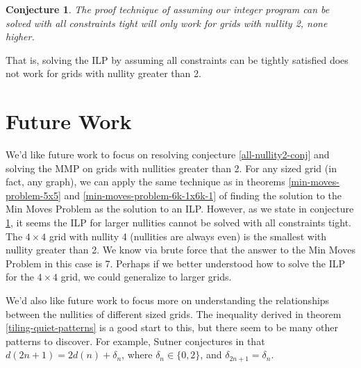 \documentclass[a4paper]{article}
\newtheorem{conjecture}{Conjecture}
\begin{document}
	\begin{conjecture}\label{ilp-conj}
		The proof technique of assuming our integer program can be solved with all constraints tight will only work for grids with nullity 2, none higher.
	\end{conjecture}
	That is, solving the ILP by assuming all constraints can be tightly satisfied does not work for grids with nullity greater than 2.
	
	\section{Future Work}
	We'd like future work to focus on resolving conjecture \ref{all-nullity2-conj} and solving the MMP on grids with nullities greater than 2.
	For any sized grid (in fact, any graph), we can apply the same technique as in theorems \ref{min-moves-problem-5x5} and \ref{min-moves-problem-6k-1x6k-1} of finding the solution to the Min Moves Problem as the solution to an ILP.
	However, as we state in conjecture \ref{ilp-conj}, it seems the ILP for larger nullities cannot be solved with all constraints tight.
	The $4 \times 4$ grid with nullity 4 (nullities are always even) is the smallest with nullity greater than 2.
	We know via brute force that the answer to the Min Moves Problem in this case is 7.
	Perhaps if we better understood how to solve the ILP for the $4 \times 4$ grid, we could generalize to larger grids.
	
	We'd also like future work to focus more on understanding the relationships between the nullities of different sized grids.
	The inequality derived in theorem \ref{tiling-quiet-patterns} is a good start to this, but there seem to be many other patterns to discover.
	For example, Sutner conjectures in \cite{Sutner1989} that $d(2n+1) = 2d(n) + \delta_n$, where $\delta_n \in \{0,2\}$, and $\delta_{2n+1} = \delta_n$.

	\newpage
	
	
\end{document}
